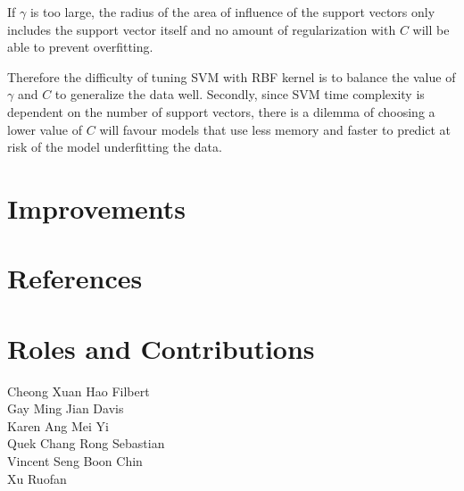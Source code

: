 \documentclass[letterpaper]{article}
\begin{document}
If $\gamma$ is too large, the radius of the area of influence of the support vectors only
includes the support vector itself and no amount of regularization with $\textit{C}$ will be
able to prevent overfitting.

Therefore the difficulty of tuning SVM with RBF kernel is to balance the value of
$\gamma$ and $\textit{C}$ to generalize the data well. Secondly, since SVM time complexity
is dependent on the number of support vectors, there is a dilemma of choosing a lower value
of $\textit{C}$ will favour models that use less memory and faster to predict at risk of
the model underfitting the data.

\section{Improvements}

\section{References}

\section{Roles and Contributions}

\begin{description}
\item [Cheong Xuan Hao Filbert]
\item [Gay Ming Jian Davis]
\item [Karen Ang Mei Yi]
\item [Quek Chang Rong Sebastian]
\item [Vincent Seng Boon Chin]
\item [Xu Ruofan]
\end{description}
\end{document}
